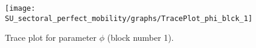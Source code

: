 \begin{figure}[H]
\centering
  \texttt{[image: SU\_sectoral\_perfect\_mobility/graphs/TracePlot\_phi\_blck\_1]}\\
    \caption{Trace plot for parameter ${\phi}$ (block number 1).}
\end{figure}
